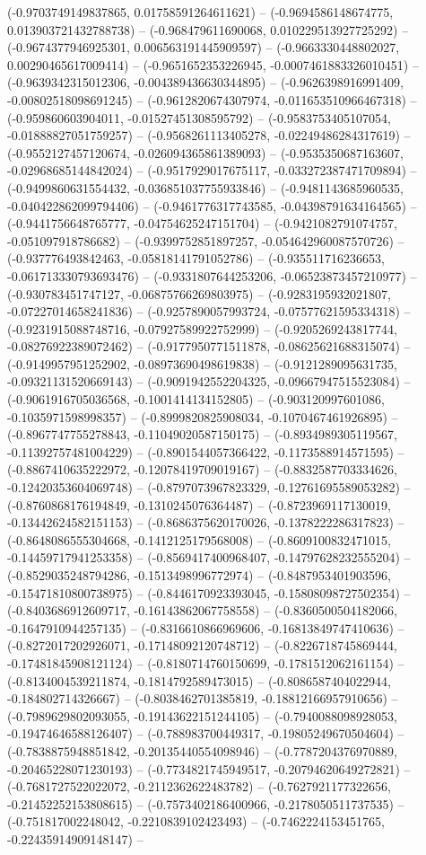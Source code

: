 (-0.9703749149837865, 0.01758591264611621) -- (-0.9694586148674775, 0.013903721432788738) -- (-0.968479611690068, 0.010229513927725292) -- (-0.9674377946925301, 0.006563191445909597) -- (-0.9663330448802027, 0.00290465617009414) -- (-0.9651652353226945, -0.0007461883326010451) -- (-0.9639342315012306, -0.004389436630344895) -- (-0.9626398916991409, -0.00802518098691245) -- (-0.9612820674307974, -0.011653510966467318) -- (-0.959860603904011, -0.01527451308595792) -- (-0.9583753405107054, -0.01888827051759257) -- (-0.9568261113405278, -0.02249486284317619) -- (-0.9552127457120674, -0.026094365861389093) -- (-0.9535350687163607, -0.02968685144842024) -- (-0.9517929017675117, -0.033272387471709894) -- (-0.9499860631554432, -0.036851037755933846) -- (-0.9481143685960535, -0.040422862099794406) -- (-0.9461776317743585, -0.04398791634164565) -- (-0.9441756648765777, -0.04754625247151704) -- (-0.9421082791074757, -0.051097918786682) -- (-0.9399752851897257, -0.054642960087570726) -- (-0.937776493842463, -0.05818141791052786) -- (-0.935511716236653, -0.061713330793693476) -- (-0.9331807644253206, -0.06523873457210977) -- (-0.930783451747127, -0.06875766269803975) -- (-0.9283195932021807, -0.07227014658241836) -- (-0.9257890057993724, -0.07577621595334318) -- (-0.9231915088748716, -0.07927589922752999) -- (-0.9205269243817744, -0.08276922389072462) -- (-0.9177950771511878, -0.08625621688315074) -- (-0.9149957951252902, -0.08973690498619838) -- (-0.9121289095631735, -0.09321131520669143) -- (-0.9091942552204325, -0.09667947515523084) -- (-0.9061916705036568, -0.1001414134152805) -- (-0.903120997601086, -0.1035971598998357) -- (-0.8999820825908034, -0.1070467461926895) -- (-0.8967747755278843, -0.11049020587150175) -- (-0.8934989305119567, -0.11392757481004229) -- (-0.8901544057366422, -0.1173588914571595) -- (-0.8867410635222972, -0.12078419709019167) -- (-0.8832587703334626, -0.12420353604069748) -- (-0.8797073967823329, -0.12761695589053282) -- (-0.8760868176194849, -0.1310245076364487) -- (-0.8723969117130019, -0.13442624582151153) -- (-0.8686375620170026, -0.1378222286317823) -- (-0.8648086555304668, -0.1412125179568008) -- (-0.8609100832471015, -0.14459717941253358) -- (-0.8569417400968407, -0.14797628232555204) -- (-0.8529035248794286, -0.1513498996772974) -- (-0.8487953401903596, -0.15471810800738975) -- (-0.8446170923393045, -0.15808098727502354) -- (-0.8403686912609717, -0.16143862067758558) -- (-0.8360500504182066, -0.1647910944257135) -- (-0.8316610866969606, -0.16813849747410636) -- (-0.8272017202926071, -0.17148092120748712) -- (-0.8226718745869444, -0.17481845908121124) -- (-0.8180714760150699, -0.1781512062161154) -- (-0.8134004539211874, -0.1814792589473015) -- (-0.8086587404022944, -0.184802714326667) -- (-0.8038462701385819, -0.18812166957910656) -- (-0.7989629802093055, -0.19143622151244105) -- (-0.7940088098928053, -0.19474646588126407) -- (-0.788983700449317, -0.19805249670504604) -- (-0.7838875948851842, -0.20135440554098946) -- (-0.7787204376970889, -0.20465228071230193) -- (-0.7734821745949517, -0.20794620649272821) -- (-0.7681727522022072, -0.2112362622483782) -- (-0.7627921177322656, -0.21452252153808615) -- (-0.7573402186400966, -0.2178050511737535) -- (-0.751817002248042, -0.2210839102423493) -- (-0.7462224153451765, -0.22435914909148147) -- 